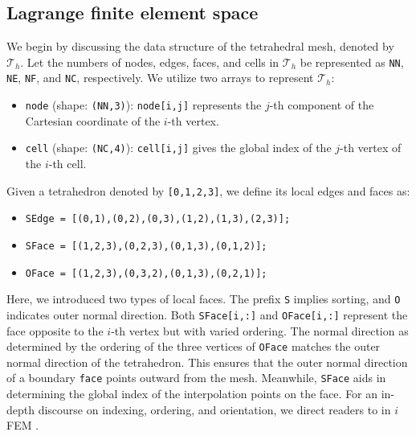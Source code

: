 \documentclass[mathpazo]{cicp}
\begin{document}
\subsection{Lagrange finite element space}

We begin by discussing the data structure of the tetrahedral mesh, denoted by
\(\mathcal T_h\). Let the numbers of nodes, edges, faces, and cells in
\(\mathcal T_h\) be represented as \lstinline{NN}, \lstinline{NE},
\lstinline{NF}, and \lstinline{NC}, respectively. We utilize two arrays to
represent \(\mathcal T_h\):
\begin{itemize}
  \item \lstinline{node} (shape: \lstinline{(NN,3)}): \lstinline{node[i,j]} represents the $j$-th component of the Cartesian coordinate of the $i$-th vertex.
  \item \lstinline{cell} (shape: \lstinline{(NC,4)}): \lstinline{cell[i,j]} gives the global index of the $j$-th vertex of the $i$-th cell.
\end{itemize}
Given a tetrahedron denoted by \lstinline{[0,1,2,3]}, we define its local edges and faces as:
\begin{itemize}
  \item \lstinline{SEdge = [(0,1),(0,2),(0,3),(1,2),(1,3),(2,3)];}
  \item \lstinline{SFace = [(1,2,3),(0,2,3),(0,1,3),(0,1,2)];}
  \item \lstinline{OFace = [(1,2,3),(0,3,2),(0,1,3),(0,2,1)];}
\end{itemize}
Here, we introduced two types of local faces. The prefix \lstinline{S} implies
sorting, and \lstinline{O} indicates outer normal direction. Both
\lstinline{SFace[i,:]} and \lstinline{OFace[i,:]} represent the face opposite to
the $i$-th vertex but with varied ordering. The normal direction as determined
by the ordering of the three vertices of \lstinline{OFace} matches the outer
normal direction of the tetrahedron. This ensures that the outer normal
direction of a boundary \lstinline{face} points outward from the mesh.
Meanwhile, \lstinline{SFace} aids in determining the global index of the
interpolation points on the face. For an in-depth discourse on indexing,
ordering, and orientation, we direct readers to  in $i$FEM
\cite{Chen.L2008c}.
\end{document}
